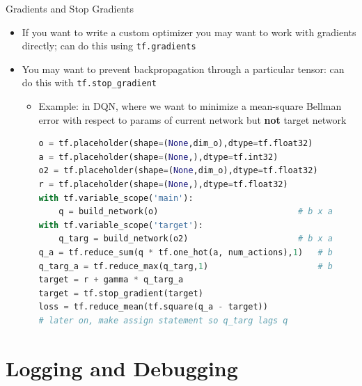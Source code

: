 \documentclass[]{beamer}
\begin{document}
\begin{frame}[fragile]{Gradients and Stop Gradients}

\begin{itemize}
\item If you want to write a custom optimizer you may want to work with gradients directly; can do this using \verb|tf.gradients|
\item You may want to prevent backpropagation through a particular tensor: can do this with \verb|tf.stop_gradient|
\begin{itemize}
\item Example: in DQN, where we want to minimize a mean-square Bellman error with respect to params of current network but \textbf{not} target network

\lstset{style=mystyle3}
\begin{lstlisting}[language=python]
o = tf.placeholder(shape=(None,dim_o),dtype=tf.float32)
a = tf.placeholder(shape=(None,),dtype=tf.int32)
o2 = tf.placeholder(shape=(None,dim_o),dtype=tf.float32)
r = tf.placeholder(shape=(None,),dtype=tf.float32)
with tf.variable_scope('main'):
    q = build_network(o)                            # b x a
with tf.variable_scope('target'):
    q_targ = build_network(o2)                      # b x a
q_a = tf.reduce_sum(q * tf.one_hot(a, num_actions),1)   # b
q_targ_a = tf.reduce_max(q_targ,1)                      # b
target = r + gamma * q_targ_a
target = tf.stop_gradient(target)
loss = tf.reduce_mean(tf.square(q_a - target))
# later on, make assign statement so q_targ lags q 
\end{lstlisting}
\lstset{style=mystyle}

\end{itemize}
\end{itemize}

\end{frame}


\section{Logging and Debugging}
\end{document}
